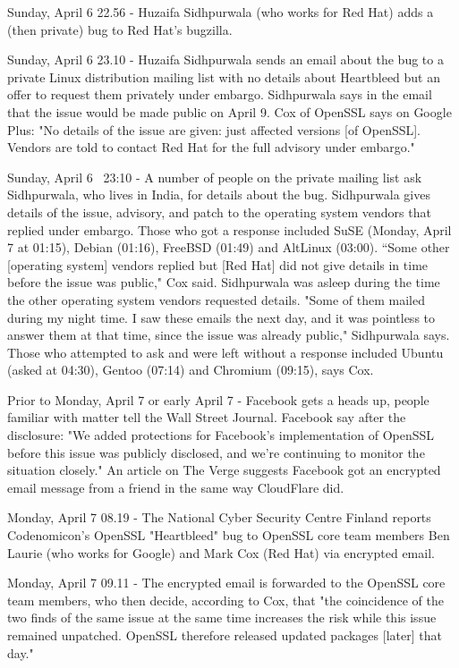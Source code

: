 Sunday, April 6 22.56 - Huzaifa Sidhpurwala (who works for Red Hat) adds a (then private) bug to Red Hat's bugzilla.

Sunday, April 6 23.10 - Huzaifa Sidhpurwala sends an email about the bug to a private Linux distribution mailing list with no details about Heartbleed but an offer to request them privately under embargo. Sidhpurwala says in the email that the issue would be made public on April 9. Cox of OpenSSL says on Google Plus: "No details of the issue are given: just affected versions [of OpenSSL]. Vendors are told to contact Red Hat for the full advisory under embargo."

Sunday, April 6 ~23:10 - A number of people on the private mailing list ask Sidhpurwala, who lives in India, for details about the bug. Sidhpurwala gives details of the issue, advisory, and patch to the operating system vendors that replied under embargo. Those who got a response included SuSE (Monday, April 7 at 01:15), Debian (01:16), FreeBSD (01:49) and AltLinux (03:00). “Some other [operating system] vendors replied but [Red Hat] did not give details in time before the issue was public," Cox said. Sidhpurwala was asleep during the time the other operating system vendors requested details. "Some of them mailed during my night time. I saw these emails the next day, and it was pointless to answer them at that time, since the issue was already public," Sidhpurwala says. Those who attempted to ask and were left without a response included Ubuntu (asked at 04:30), Gentoo (07:14) and Chromium (09:15), says Cox. 

Prior to Monday, April 7 or early April 7 - Facebook gets a heads up, people familiar with matter tell the Wall Street Journal. Facebook say after the disclosure: "We added protections for Facebook’s implementation of OpenSSL before this issue was publicly disclosed, and we're continuing to monitor the situation closely." An article on The Verge suggests Facebook got an encrypted email message from a friend in the same way CloudFlare did.

Monday, April 7 08.19 - The National Cyber Security Centre Finland reports Codenomicon's OpenSSL "Heartbleed" bug to OpenSSL core team members Ben Laurie (who works for Google) and Mark Cox (Red Hat) via encrypted email.

Monday, April 7 09.11 - The encrypted email is forwarded to the OpenSSL core team members, who then decide, according to Cox, that "the coincidence of the two finds of the same issue at the same time increases the risk while this issue remained unpatched. OpenSSL therefore released updated packages [later] that day."

